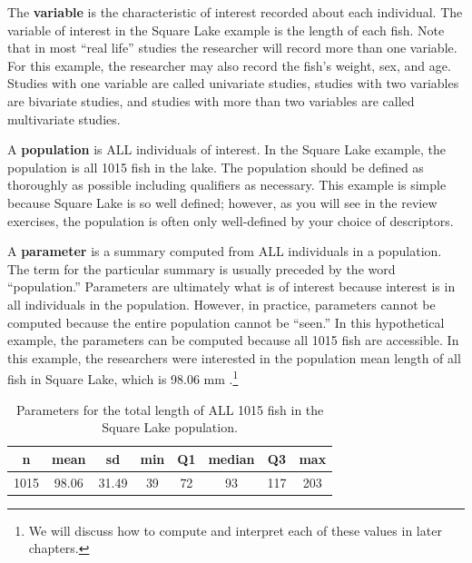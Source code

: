 \documentclass[10pt,openany]{book}\usepackage[]{graphicx}\usepackage[]{color}
\begin{document}

\vspace{-12pt}

The \textbf{variable} is the characteristic of interest recorded about each individual. The variable of interest in the Square Lake example is the length of each fish. Note that in most ``real life'' studies the researcher will record more than one variable.  For this example, the researcher may also record the fish's weight, sex, and age.  Studies with one variable are called univariate studies, studies with two variables are bivariate studies, and studies with more than two variables are called multivariate studies.


A \textbf{population} is ALL individuals of interest. In the Square Lake example, the population is all 1015 fish in the lake.  The population should be defined as thoroughly as possible including qualifiers as necessary.  This example is simple because Square Lake is so well defined; however, as you will see in the review exercises, the population is often only well-defined by your choice of descriptors.


A \textbf{parameter} is a summary computed from ALL individuals in a population.  The term for the particular summary is usually preceded by the word ``population.''  Parameters are ultimately what is of interest because interest is in all individuals in the population.  However, in practice, parameters cannot be computed because the entire population cannot be ``seen.''  In this hypothetical example, the parameters can be computed because all 1015 fish are accessible.  In this example, the researchers were interested in the population mean length of all fish in Square Lake, which is 98.06 mm .\footnote{We will discuss how to compute and interpret each of these values in later chapters.}

\begin{table}[ht]
\centering
\caption{Parameters for the total length of ALL 1015 fish in the Square Lake population.} 
\label{tab:SquareLakePopn}
\begin{tabular}{cccccccc}
 n & mean & sd & min & Q1 & median & Q3 & max \\ 
  \hline
1015 & 98.06 & 31.49 & 39 & 72 & 93 & 117 & 203 \\ 
   \hline
\end{tabular}
\end{table}
\end{document}
